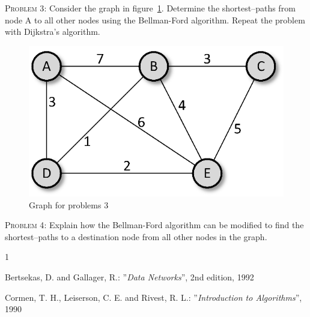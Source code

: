 \documentclass[a4paper]{article}
\newenvironment{problem}[1]%
{\noindent{}\textsc{Problem #1}: }{\vspace{12pt}}
\begin{document}
\begin{problem}{3}
Consider the graph in figure~\ref{fig:graphs2}. Determine the
shortest--paths from node A to all other nodes using the
Bellman-Ford algorithm. Repeat the problem with Dijkstra's
algorithm.
\begin{figure}[ht] \centering
\includegraphics{graphs2.eps}
\caption{\label{fig:graphs2}Graph for problems 3}
\end{figure}
\end{problem}

\begin{problem}{4}
Explain how the Bellman-Ford algorithm can be modified to find
the shortest--paths to a destination node from all other nodes in
the graph.
\end{problem}

\begin{thebibliography}{1}

Bertsekas, D. and Gallager, R.: ''\emph{Data
Networks}'', 2nd edition, 1992

Cormen, T. H., Leiserson, C. E. and Rivest, R.
L.: ''\emph{Introduction to Algorithms}'', 1990

\end{thebibliography}
\end{document}
